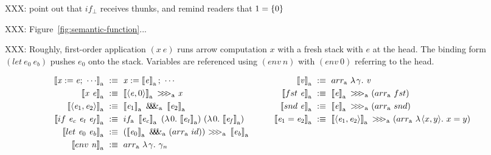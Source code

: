 \documentclass[preprint]{sigplanconf}
\newcommand{\arrowarr}{\ensuremath{arr}}
\newcommand{\arrowcomp}{\ensuremath{{>}\mspace{-6mu}{>}\mspace{-6mu}{>}}}
\newcommand{\arrowpair}{\ensuremath{\mathit{\&\mspace{-7.5mu}\&\mspace{-7.5mu}\&}}}
\newcommand{\arrowif}{\ensuremath{if}}
\newcommand{\ifbot}{\arrowif_\bot}
\begin{document}
XXX: point out that $\ifbot$ receives thunks, and remind readers that $1 = \{{0}\}$

XXX: Figure~\ref{fig:semantic-function}...

XXX: Roughly, first-order application $(\mathit{x~e})$ runs arrow computation $\mathit{x}$ with a fresh stack with $\mathit{e}$ at the head.
The binding form $(let~\mathit{e}_0~\mathit{e_b})$ pushes $\mathit{e}_0$ onto the stack.
Variables are referenced using $(env~\mathit{n})$ with $(env~0)$ referring to the head.

\newcommand{\gen}{_\mathrm{a}}
\newcommand{\genb}{_\mathrm{b}}

\begin{figure*}[t]\centering
\begin{align*}
\begin{aligned}[t]
	\meaningof{\mathit{x} := \mathit{e};\ \cdots}\gen &\ :\equiv\
		\mathit{x} := \meaningof{\mathit{e}}\gen;\ \cdots \\
	\meaningof{\mathit{x}~\mathit{e}}\gen &\ :\equiv\
		\meaningof{\pair{\mathit{e},0}}\gen~\arrowcomp\gen~\mathit{x}
\\
	\meaningof{\pair{\mathit{e}_1,\mathit{e}_2}}\gen &\ :\equiv\
		\meaningof{\mathit{e}_1}\gen~\arrowpair\gen~\meaningof{\mathit{e}_2}\gen
\\
	\meaningof{if~\mathit{e_c}~\mathit{e_t}~\mathit{e_f}}\gen &\ :\equiv\
		if\gen~
			\meaningof{\mathit{e_c}}\gen~
			(\fun{0}{\meaningof{\mathit{e_t}}\gen})~
			(\fun{0}{\meaningof{\mathit{e_f}}\gen})
\\
	\meaningof{let~\mathit{e}_0~\mathit{e_b}}\gen &\ :\equiv\ 
		(\meaningof{\mathit{e}_0}\gen~\arrowpair\gen~(\arrowarr\gen~id))~
			\arrowcomp\gen~
		\meaningof{\mathit{e_b}}\gen
\\
	\meaningof{env~\mathit{n}}\gen &\ :\equiv\ \arrowarr\gen~\fun{\gamma}{\gamma_\mathit{n}}
\\
\end{aligned}
&\tab\tab\tab
\begin{aligned}[t]
	\meaningof{\mathit{v}}\gen &\ :\equiv\ \arrowarr\gen~\fun{\gamma}{\mathit{v}}
\\
	\meaningof{fst~\mathit{e}}\gen &\ :\equiv\
		\meaningof{\mathit{e}}\gen~\arrowcomp\gen~(\arrowarr\gen~fst)
\\
	\meaningof{snd~\mathit{e}}\gen &\ :\equiv\
		\meaningof{\mathit{e}}\gen~\arrowcomp\gen~(\arrowarr\gen~snd)
\\
	\meaningof{\mathit{e}_1 = \mathit{e}_2}\gen &\ :\equiv\
		\meaningof{\pair{\mathit{e}_1,\mathit{e}_2}}\gen~\arrowcomp\gen~(\arrowarr\gen~\fun{\pair{x,y}}{x = y})

\end{aligned}
\end{align*}
\end{figure*}
\end{document}
